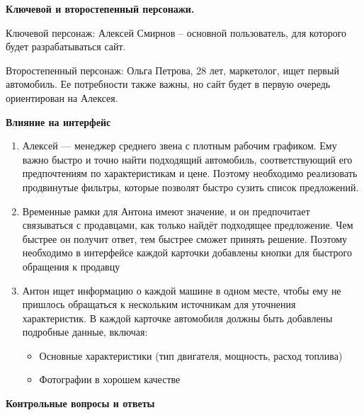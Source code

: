 \textbf{Ключевой и второстепенный персонажи.}

Ключевой персонаж: Алексей Смирнов – основной пользователь, для которого будет разрабатываться сайт.

Второстепенный персонаж: Ольга Петрова, 28 лет, маркетолог, ищет первый автомобиль. Ее потребности также важны, но сайт будет в первую очередь ориентирован на Алексея.
\bigskip

\textbf{Влияние на интерфейс}
\bigskip

\begin{enumerate}
    \item Алексей — менеджер среднего звена с плотным рабочим графиком. Ему важно быстро и точно найти подходящий автомобиль, соответствующий его предпочтениям по характеристикам и цене. Поэтому необходимо реализовать продвинутые фильтры, которые позволят быстро сузить список предложений.

    \item Временные рамки для Антона имеют значение, и он предпочитает связываться с продавцами, как только найдёт подходящее предложение. Чем быстрее он получит ответ, тем быстрее сможет принять решение. Поэтому необходимо в интерфейсе каждой карточки добавлены кнопки для быстрого обращения к продавцу

    \item Антон ищет информацию о каждой машине в одном месте, чтобы ему не пришлось обращаться к нескольким источникам для уточнения характеристик. В каждой карточке автомобиля должны быть добавлены подробные данные, включая:

    \begin{itemize}
        \item Основные характеристики (тип двигателя, мощность, расход топлива)
        \item Фотографии в хорошем качестве
    \end{itemize}
\end{enumerate}

\textbf{Контрольные вопросы и ответы}


